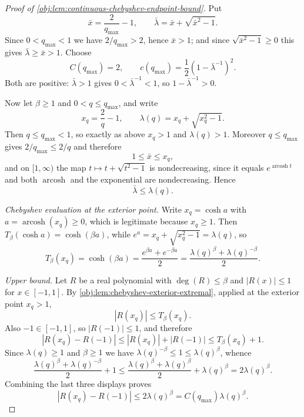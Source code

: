 \documentclass[11pt]{article}
\begin{document}
\begin{proof}[Proof of \cref{obj:lem:continuous-chebyshev-endpoint-bound}]
Put
\[
\bar{x}=\frac{2}{q_{\max}}-1,
\qquad
\bar{\lambda}=\bar{x}+\sqrt{\bar{x}^2-1}.
\]
Since \(0<q_{\max}<1\) we have \(2/q_{\max}>2\), hence \(\bar{x}>1\); and since \(\sqrt{\bar{x}^2-1}\ge0\) this gives \(\bar{\lambda}\ge \bar{x}>1\). Choose
\[
C(q_{\max})=2,
\qquad
c(q_{\max})=\frac12(1-\bar{\lambda}^{-1})^2 .
\]
Both are positive: \(\bar{\lambda}>1\) gives \(0<\bar{\lambda}^{-1}<1\), so \(1-\bar{\lambda}^{-1}>0\). %

Now let \(\beta\ge1\) and \(0<q\le q_{\max}\), and write
\[
x_q=\frac2q-1,
\qquad
\lambda(q)=x_q+\sqrt{x_q^2-1}.
\]
Then \(q\le q_{\max}<1\), so exactly as above \(x_q>1\) and \(\lambda(q)>1\). Moreover \(q\le q_{\max}\) gives \(2/q_{\max}\le 2/q\) and therefore
\[
1\le \bar{x}\le x_q ,
\]
and on \([1,\infty)\) the map \(t\mapsto t+\sqrt{t^2-1}\) is nondecreasing, since it equals \(e^{\operatorname{arcosh} t}\) and both \(\operatorname{arcosh}\) and the exponential are nondecreasing. Hence
\[
\bar{\lambda}\le \lambda(q).
\] %

\emph{Chebyshev evaluation at the exterior point.}
Write \(x_q=\operatorname{cosh}a\) with \(a=\operatorname{arcosh}(x_q)\ge0\), which is legitimate because \(x_q\ge1\). Then \(T_\beta(\operatorname{cosh}a)=\operatorname{cosh}(\beta a)\), while \(e^{a}=x_q+\sqrt{x_q^2-1}=\lambda(q)\), so
\[
T_\beta(x_q)
=
\operatorname{cosh}(\beta a)
=
\frac{e^{\beta a}+e^{-\beta a}}{2}
=
\frac{\lambda(q)^\beta+\lambda(q)^{-\beta}}2 .
\] %

\emph{Upper bound.}
Let \(R\) be a real polynomial with \(\deg(R)\le\beta\) and \(|R(x)|\le1\) for \(x\in[-1,1]\). By \cref{obj:lem:chebyshev-exterior-extremal}, applied at the exterior point \(x_q>1\),
\[
|R(x_q)|\le T_\beta(x_q).
\] %
Also \(-1\in[-1,1]\), so \(|R(-1)|\le1\), and therefore
\[
|R(x_q)-R(-1)|
\le |R(x_q)|+|R(-1)|
\le T_\beta(x_q)+1.
\] %
Since \(\lambda(q)\ge1\) and \(\beta\ge1\) we have \(\lambda(q)^{-\beta}\le1\le\lambda(q)^{\beta}\), whence
\[
\frac{\lambda(q)^\beta+\lambda(q)^{-\beta}}2+1
\le
\frac{\lambda(q)^\beta+\lambda(q)^{\beta}}2+\lambda(q)^\beta
=
2\lambda(q)^\beta.
\] %
Combining the last three displays proves
\[
|R(x_q)-R(-1)|\le 2\lambda(q)^\beta
= C(q_{\max})\lambda(q)^\beta.
\]


\end{proof}
\end{document}
